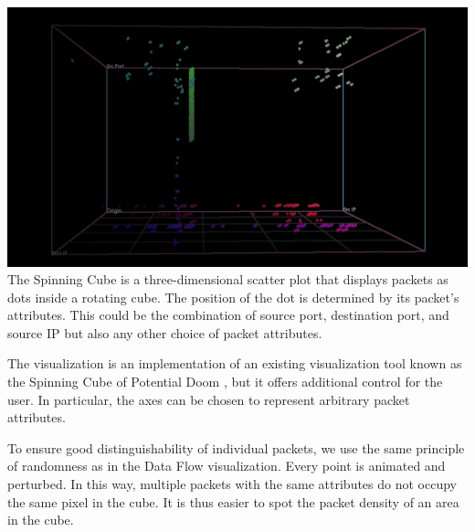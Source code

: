 \includegraphics[width=\linewidth]{materials/cube.jpg}
The Spinning Cube is a three-dimensional scatter plot that displays packets as dots inside a rotating cube. The position of the dot is determined by its packet's attributes. This could be the combination of source port, destination port, and source IP but also any other choice of packet attributes.

The visualization is an implementation of an existing visualization tool known as the Spinning Cube of Potential Doom \cite{lau2004spinning}, but it offers additional control for the user. In particular, the axes can be chosen to represent arbitrary packet attributes.

To ensure good distinguishability of individual packets, we use the same principle of randomness as in the Data Flow visualization. Every point is animated and perturbed. In this way, multiple packets with the same attributes do not occupy the same pixel in the cube. It is thus easier to spot the packet density of an area in the cube.
